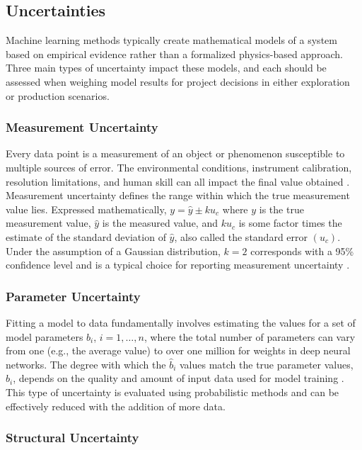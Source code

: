 \subsection{Uncertainties} \label{ch2:uncertainty}
Machine learning methods typically create mathematical models of a system based on empirical evidence rather than a formalized physics-based approach. Three main types of uncertainty impact these models, and each should be assessed when weighing model results for project decisions in either exploration or production scenarios. 

\subsubsection{Measurement Uncertainty}\label{ch2:measurement_uncertainty}
Every data point is a measurement of an object or phenomenon susceptible to multiple sources of error. The environmental conditions, instrument calibration, resolution limitations, and human skill can all impact the final value obtained \citep[p.\ 11--14]{baird_experimentation_1962}. Measurement uncertainty defines the range within which the true measurement value lies. Expressed mathematically, $y=\hat{y} \pm ku_c$ where $y$ is the true measurement value, $\hat{y}$ is the measured value, and $ku_c$ is some factor times the estimate of the standard deviation of $\hat{y}$, also called the standard error $(u_c)$. Under the assumption of a Gaussian distribution, $k=2$ corresponds with a 95\% confidence level and is a typical choice for reporting measurement uncertainty \citep{nist_nist_2021}.

\subsubsection{Parameter Uncertainty}\label{ch2:parameter_uncertainty}

Fitting a model to data fundamentally involves estimating the values for a set of model parameters $b_i$, $i = 1,\ldots,n$, where the total number of parameters can vary from one (e.g., the average value) to over one million for weights in deep neural networks. The degree with which the $\hat{b}_i$ values match the true parameter values, $b_i$, depends on the quality and amount of input data used for model training \citep[p.\ 81]{james_introduction_2013}. This type of uncertainty is evaluated using probabilistic methods and can be effectively reduced with the addition of more data. 

\subsubsection{Structural Uncertainty}\label{ch2:structural_uncertainty}

